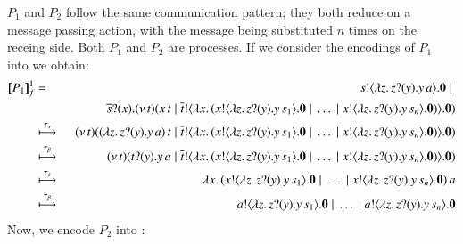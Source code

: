 \noi 
$P_1$ and $P_2$ follow the same communication pattern; they both
reduce on a message passing action, with the
message being substituted $n$ times on the receing side.
Both $P_1$ and $P_2$ are \HOp processes.
If we consider the encodings of $P_1$ into \HO   
we obtain:
\begin{eqnarray*}
[\!\![P_1]\!\!]^{1}_f & = &  	s ! \langle \lambda z.\,z ? (y) . y\, {a} \rangle . \mathbf{0} \;|\; \\
& & \qquad \quad \overline{s} ? (x) . (\nu\, t)(x\, {t} \;|\; \overline{t} ! \langle \lambda x.\,(x ! \langle \lambda z.\,z ? (y) . y\, {s_1} \rangle . \mathbf{0} \;|\; \dots \;|\; x ! \langle \lambda z.\,z ? (y) . y\, {s_n} \rangle . \mathbf{0}) \rangle . \mathbf{0})\\
	& \stackrel{\tau_{s}}{\longmapsto}& 
	(\nu\, t)((\lambda z.\,z ? (y) . y\, {a})\, {t} \;|\; \overline{t} ! \langle \lambda x.\,(x ! \langle \lambda z.\,z ? (y) . y\, {s_1} \rangle . \mathbf{0} \;|\; \dots \;|\; x ! \langle \lambda z.\,z ? (y) . y\, {s_n} \rangle . \mathbf{0}) \rangle . \mathbf{0})\\
	& \stackrel{\tau_{\beta}}{\longmapsto} & 
	(\nu\, t)(t ? (y) . y\, {a} \;|\; \overline{t} ! \langle \lambda x.\,(x ! \langle \lambda z.\,z ? (y) . y\, {s_1} \rangle . \mathbf{0} \;|\; \dots \;|\; x ! \langle \lambda z.\,z ? (y) . y\, {s_n} \rangle . \mathbf{0}) \rangle . \mathbf{0})\\
	& \stackrel{\tau_{s}}{\longmapsto} & 
	\lambda x.\,(x ! \langle \lambda z.\,z ? (y) . y\, {s_1} \rangle . \mathbf{0} \;|\; \dots \;|\; x ! \langle \lambda z.\,z ? (y) . y\, {s_n} \rangle . \mathbf{0})\, {a}
	\\
	& \stackrel{\tau_{\beta}}{\longmapsto} & 
	a ! \langle \lambda z.\,z ? (y) . y\, {s_1} \rangle . \mathbf{0} \;|\; \dots \;|\; a ! \langle \lambda z.\,z ? (y) . y\, {s_n} \rangle . \mathbf{0}
\end{eqnarray*}
Now, we encode $P_2$ into \sessp:
